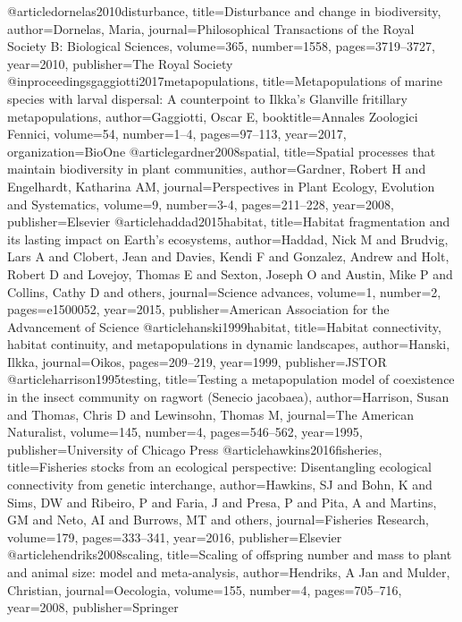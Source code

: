 @article{dornelas2010disturbance,
	title={Disturbance and change in biodiversity},
	author={Dornelas, Maria},
	journal={Philosophical Transactions of the Royal Society B: Biological Sciences},
	volume={365},
	number={1558},
	pages={3719--3727},
	year={2010},
	publisher={The Royal Society}
}
@inproceedings{gaggiotti2017metapopulations,
	title={Metapopulations of marine species with larval dispersal: A counterpoint to Ilkka's Glanville fritillary metapopulations},
	author={Gaggiotti, Oscar E},
	booktitle={Annales Zoologici Fennici},
	volume={54},
	number={1--4},
	pages={97--113},
	year={2017},
	organization={BioOne}
}
@article{gardner2008spatial,
	title={Spatial processes that maintain biodiversity in plant communities},
	author={Gardner, Robert H and Engelhardt, Katharina AM},
	journal={Perspectives in Plant Ecology, Evolution and Systematics},
	volume={9},
	number={3-4},
	pages={211--228},
	year={2008},
	publisher={Elsevier}
}
@article{haddad2015habitat,
	title={Habitat fragmentation and its lasting impact on Earth’s ecosystems},
	author={Haddad, Nick M and Brudvig, Lars A and Clobert, Jean and Davies, Kendi F and Gonzalez, Andrew and Holt, Robert D and Lovejoy, Thomas E and Sexton, Joseph O and Austin, Mike P and Collins, Cathy D and others},
	journal={Science advances},
	volume={1},
	number={2},
	pages={e1500052},
	year={2015},
	publisher={American Association for the Advancement of Science}
}
@article{hanski1999habitat,
	title={Habitat connectivity, habitat continuity, and metapopulations in dynamic landscapes},
	author={Hanski, Ilkka},
	journal={Oikos},
	pages={209--219},
	year={1999},
	publisher={JSTOR}
}
@article{harrison1995testing,
	title={Testing a metapopulation model of coexistence in the insect community on ragwort (Senecio jacobaea)},
	author={Harrison, Susan and Thomas, Chris D and Lewinsohn, Thomas M},
	journal={The American Naturalist},
	volume={145},
	number={4},
	pages={546--562},
	year={1995},
	publisher={University of Chicago Press}
}
@article{hawkins2016fisheries,
	title={Fisheries stocks from an ecological perspective: Disentangling ecological connectivity from genetic interchange},
	author={Hawkins, SJ and Bohn, K and Sims, DW and Ribeiro, P and Faria, J and Presa, P and Pita, A and Martins, GM and Neto, AI and Burrows, MT and others},
	journal={Fisheries Research},
	volume={179},
	pages={333--341},
	year={2016},
	publisher={Elsevier}
}
@article{hendriks2008scaling,
	title={Scaling of offspring number and mass to plant and animal size: model and meta-analysis},
	author={Hendriks, A Jan and Mulder, Christian},
	journal={Oecologia},
	volume={155},
	number={4},
	pages={705--716},
	year={2008},
	publisher={Springer}
}
